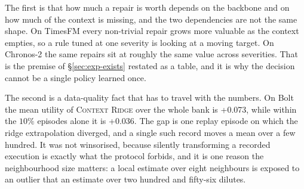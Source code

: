 \documentclass{article}
\begin{document}
The first is that how much a repair is worth depends on the backbone and on how much of the
context is missing, and the two dependencies are not the same shape. On TimesFM every
non-trivial repair grows more valuable as the context empties, so a rule tuned at one severity
is looking at a moving target. On Chronos-2 the same repairs sit at roughly the same value
across severities. That is the premise of \S\ref{sec:exp-exists} restated as a table, and it is
why the decision cannot be a single policy learned once.

The second is a data-quality fact that has to travel with the numbers. On Bolt the mean utility
of \textsc{Context Ridge} over the whole bank is +0.073, while within the $10\%$
episodes alone it is +0.036. The gap is one replay episode on which the ridge
extrapolation diverged, and a single such record moves a mean over a few hundred. It was not
winsorised, because silently transforming a recorded execution is exactly what the protocol
forbids, and it is one reason the neighbourhood size matters: a local estimate over eight
neighbours is exposed to an outlier that an estimate over two hundred and fifty-six dilutes.
\end{document}
